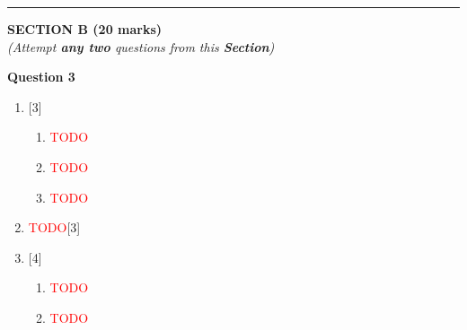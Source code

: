 \par\noindent\rule{\textwidth}{0.4pt}
\begin{center}
   \large
   \textbf{SECTION B (20 marks)}\\
   \vspace{5mm}
   \normalsize
   \textit{(Attempt \textbf{any two} questions from this \textbf{Section})}
\end{center}
\par

\noindent
\textbf{Question 3}
\begin{enumerate}[label=(\roman*)]

    \item \hfill [3]
        \begin{enumerate}[label=(\alph*)]
            \item \textcolor{red}{TODO}
            \item \textcolor{red}{TODO}
            \item \textcolor{red}{TODO}
        \end{enumerate}

    \item \textcolor{red}{TODO}\hfill [3]

    \item \hfill [4]
        \begin{enumerate}[label=(\alph*)]
            \item \textcolor{red}{TODO}
            \item \textcolor{red}{TODO}
        \end{enumerate}

\end{enumerate}

